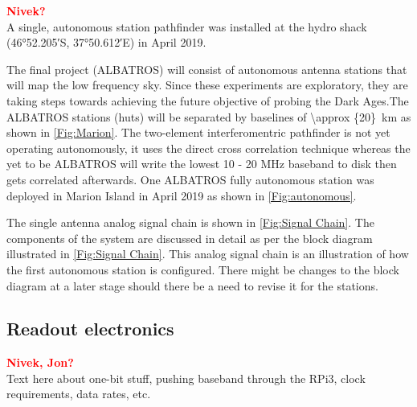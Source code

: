 \documentclass{ws-jai}
\begin{document}
\textcolor{red}{\bf Nivek?} \\

A single, autonomous station pathfinder was installed at the hydro
shack (\ang{46;52.205;}S, \ang{37;50.612;}E) in April 2019. 

The final project (ALBATROS) will consist of autonomous antenna stations that will map the low frequency sky. Since these experiments are exploratory, they are taking steps towards achieving the future
objective of probing the Dark Ages.The ALBATROS stations (huts) will
be separated by baselines of \SI{\approx {20}}{km} as shown in
\autoref{Fig:Marion}. The two-element interferomentric pathfinder is
not yet operating autonomously, it uses the direct cross correlation
technique whereas the yet to be ALBATROS will write the lowest 10 - 20
MHz baseband to disk then gets correlated afterwards. One ALBATROS
fully autonomous station was deployed in Marion Island in April 2019
as shown in \autoref{Fig:autonomous}.

The single antenna analog signal chain is shown in \autoref{Fig:Signal
  Chain}. The components of the system are discussed in detail as per
the block diagram illustrated in \autoref{Fig:Signal Chain}. This
analog signal chain is an illustration of how the first autonomous
station is configured. There might be changes to the block diagram at
a later stage should there be a need to revise it for the stations.


% 

\subsection{Readout electronics}
\textcolor{red}{\bf Nivek, Jon?} \\
Text here about one-bit stuff, pushing baseband through the RPi3,
clock requirements, data rates, etc.
\end{document}
